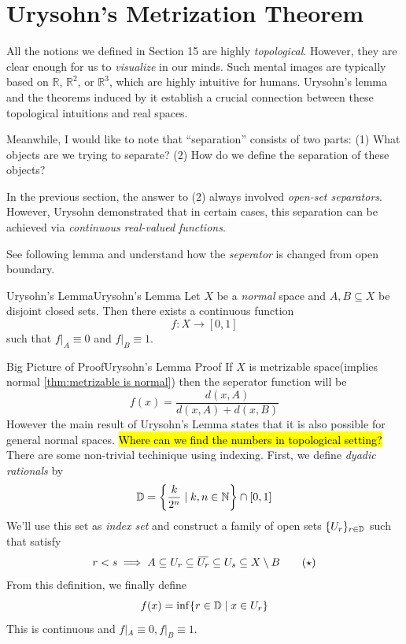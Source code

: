 \documentclass[12pt, a4paper, twoside]{article}
\newcommand{\overbar}[1]{\mkern 1.5mu\overline{\mkern-1.5mu#1\mkern-1.5mu}\mkern 1.5mu}
\theoremstyle{plain}
\begin{document}
\newpage

\section{Urysohn's Metrization Theorem}

All the notions we defined in Section 15 are highly \textit{topological}. 
However, they are clear enough for us to \textit{visualize} in our minds. 
Such mental images are typically based on $\mathbb{R}$, $\mathbb{R}^2$, or $\mathbb{R}^3$, which are highly intuitive for humans. 
Urysohn's lemma and the theorems induced by it establish a crucial connection between these topological intuitions and real spaces.

Meanwhile, I would like to note that ``separation'' consists of two parts: 
(1) What objects are we trying to separate? 
(2) How do we define the separation of these objects?

In the previous section, the answer to (2) always involved \textit{open-set separators}. 
However, Urysohn demonstrated that in certain cases, this separation can be achieved via \textit{continuous real-valued functions}.

See following lemma and understand how the \textit{seperator} is changed from open boundary. 

\begin{lem}{Urysohn's Lemma}{Urysohn's Lemma}
    Let $X$ be a \textit{normal} space and $A, B \subseteq X$ be disjoint closed sets. 
    Then there exists a continuous function 
    \[f: X \rightarrow [0, 1]\]
    such that $f|_A \equiv 0$ and $f|_B \equiv 1$. 
\end{lem}

\begin{claim}{Big Picture of Proof}{Urysohn's Lemma Proof}
    If $X$ is metrizable space(implies normal \ref{thm:metrizable is normal}) then the seperator function will be 
    \[f(x) = \frac{d(x, A)}{d(x, A) + d(x, B)}\]
    However the main result of Urysohn's Lemma states that it is also possible for general normal spaces. 
    \hl{Where can we find the numbers in topological setting?} There are some non-trivial techinique using indexing. 
    First, we define \textit{dyadic rationals} by 
    \[{\mathbb {D}} = \left\{\frac{k}{2^n} \mid k, n \in {\mathbb {N}}\right\} \cap [0, 1]\]
    We'll use this set as \textit{index set} and construct a family of open sets $\{U_r\}_{r \in {\mathbb {D}}}$ such that satisfy
    \[r < s \implies A \subseteq U_r \subseteq \overbar{U_r} \subseteq U_s \subseteq X \setminus B \tag{$\star$}\]
    From this definition, we finally define 
    \[f(x) = \inf \{r \in {\mathbb {D}} \mid x \in U_r\}\]
    This is continuous and $f|_A \equiv 0, f|_B \equiv 1$. 
\end{claim}
\end{document}
